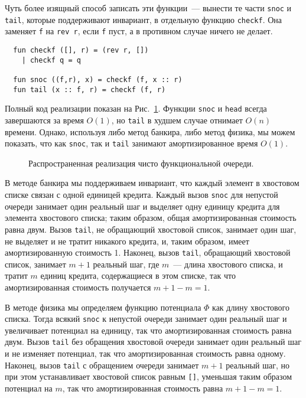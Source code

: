 Чуть более изящный способ записать эти функции~--- вынести те части
\lstinline!snoc! и \lstinline!tail!, которые поддерживают инвариант, в
отдельную функцию \lstinline!checkf!. Она заменяет \lstinline!f! на
\lstinline!rev r!, если \lstinline!f! пуст, а в противном случае
ничего не делает.
\begin{lstlisting}
  fun checkf ([], r) = (rev r, [])
    | checkf q = q

  fun snoc ((f,r), x) = checkf (f, x :: r)
  fun tail (x :: f, r) = checkf (f, r)
\end{lstlisting}
Полный код реализации показан на Рис.~\ref{fig:5.2}. Функции
\lstinline!snoc! и \lstinline!head! всегда завершаются за время
$O(1)$, но \lstinline!tail! в худшем случае отнимает $O(n)$
времени. Однако, используя либо метод банкира, либо метод физика, мы
можем показать, что как \lstinline!snoc!, так и \lstinline!tail!
занимают амортизированное время $O(1)$.

\begin{figure}
  \centering

  \caption{Распространенная реализация чисто функциональной очереди.}
  \label{fig:5.2}
\end{figure}

В методе банкира мы поддерживаем инвариант, что каждый элемент в
хвостовом списке связан с одной единицей кредита. Каждый вызов
\lstinline!snoc! для непустой очереди занимает один реальный шаг и
выделяет одну единицу кредита для элемента хвостового списка; таким
образом, общая амортизированная стоимость равна двум. Вызов
\lstinline!tail!, не обращающий хвостовой список, занимает один шаг,
не выделяет и не тратит никакого кредита, и, таким образом, имеет
амортизированную стоимость 1. Наконец, вызов \lstinline!tail!,
обращающий хвостовой список, занимает $m+1$ реальный шаг, где $m$~---
длина хвостового списка, и тратит $m$ единиц кредита, содержащиеся в
этом списке, так что амортизированная стоимость получается $m + 1 - m
= 1$.

В методе физика мы определяем функцию потенциала $\Phi$ как длину
хвостового списка. Тогда всякий \lstinline!snoc! к непустой очереди
занимает один реальный шаг и увеличивает потенциал на единицу, так что
амортизированная стоимость равна двум. Вызов \lstinline!tail! без
обращения хвостовой очереди занимает один реальный шаг и не изменяет
потенциал, так что амортизированная стоимость равна одному. Наконец,
вызов \lstinline!tail! с обращением очереди занимает $m+1$ реальный
шаг, но при этом устанавливает хвостовой список равным \lstinline![]!,
уменьшая таким образом потенциал на $m$, так что амортизированная
стоимость равна $m + 1 - m = 1$.

